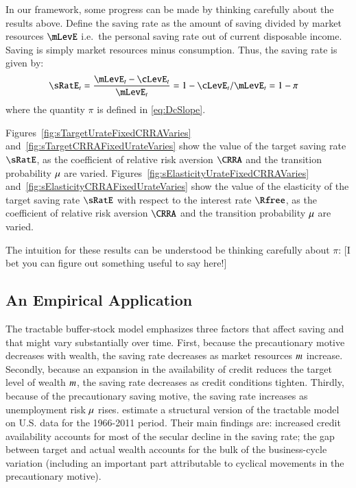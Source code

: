\documentclass[titlepage,abstract]{\econtex}\newcommand{\texname}{ctDiscrete}
\begin{document}
In our framework, some progress can be made by thinking carefully
about the results above.  Define the saving rate as the amount of saving divided by market
resources $\mLevE$ i.e.\ the personal saving rate out of current
disposable income. Saving is simply market resources minus
consumption. Thus, the saving rate is given by:
\begin{align}
\sRatE_{t} & = \frac{\mLevE_{t}-\cLevE_{t}}{\mLevE_{t}} = 1-\cLevE_{t}/\mLevE_{t} = 1 - \pi
\end{align}
where the quantity $\pi$ is defined in \eqref{eq:DcSlope}.

Figures~\ref{fig:sTargetUrateFixedCRRAVaries}
and~\ref{fig:sTargetCRRAFixedUrateVaries} show the value of the target
saving rate $\sRatE$, as the coefficient of relative risk aversion
$\CRRA$ and the transition probability $\mu$ are
varied. Figures~\ref{fig:sElasticityUrateFixedCRRAVaries}
and~\ref{fig:sElasticityCRRAFixedUrateVaries} show the value of the
elasticity of the target saving rate $\sRatE$ with respect to the
interest rate $\Rfree$, as the coefficient of relative risk aversion
$\CRRA$ and the transition probability $\mu$ are varied.

The intuition for these results can be understood be thinking carefully
about $\pi$: [I bet you can figure out something useful to say here!]



\subsection{An Empirical Application \label{sec:empirical} }
The tractable buffer-stock model emphasizes three factors that affect saving and that might vary substantially over time. First, because the precautionary motive decreases with wealth, the saving rate decreases as market resources $m$ increase. Secondly, because an expansion
in the availability of credit reduces the target level of wealth $m$, the saving rate decreases as credit conditions tighten. Thirdly, because of the precautionary saving motive, the saving rate increases as unemployment risk $\mu$ rises. \cite{cssUSsaving} estimate a structural version of the tractable model on U.S. data for the 1966-2011 period. Their main findings are: increased credit availability accounts for most of the secular decline in the saving rate; the gap between target and actual wealth accounts for the bulk of the business-cycle variation (including an important part attributable to cyclical movements in the precautionary motive). 
\end{document}
